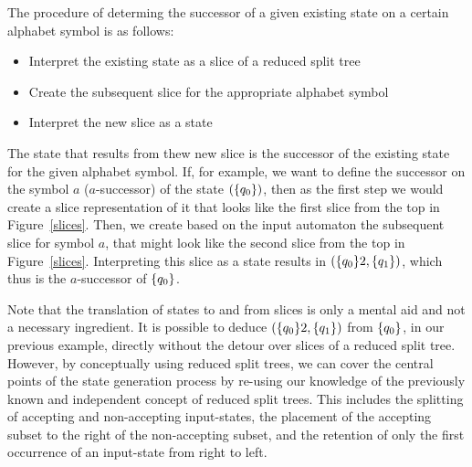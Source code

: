The procedure of determing the successor of a given existing state on a certain alphabet symbol is as follows:
\begin{itemize}
\item Interpret the existing state as a slice of a reduced split tree
\item Create the subsequent slice for the appropriate alphabet symbol
\item Interpret the new slice as a state
\end{itemize}
The state that results from thew new slice is the successor of the existing state for the given alphabet symbol. If, for example, we want to define the successor on the symbol $a$ ($a$-successor) of the state $(\{q_{0}\})$, then as the first step we would create a slice representation of it that looks like the first slice from the top in Figure~\ref{slices}. Then, we create based on the input automaton the subsequent slice for symbol $a$, that might look like the second slice from the top in Figure~\ref{slices}. Interpreting this slice as a state results in $(\{q_{0}\}2,\{q_{1}\})$, which thus is the $a$-successor of $\{q_{0}\}$.

Note that the translation of states to and from slices is only a mental aid and not a necessary ingredient. It is possible to deduce $(\{q_{0}\}2,\{q_{1}\})$ from $\{q_{0}\}$, in our previous example, directly without the detour over slices of a reduced split tree. However, by conceptually using reduced split trees, we can cover the central points of the state generation process by re-using our knowledge of the previously known and independent concept of reduced split trees. This includes the splitting of accepting and non-accepting input-states, the placement of the accepting subset to the right of the non-accepting subset, and the retention of only the first occurrence of an input-state from right to left.









